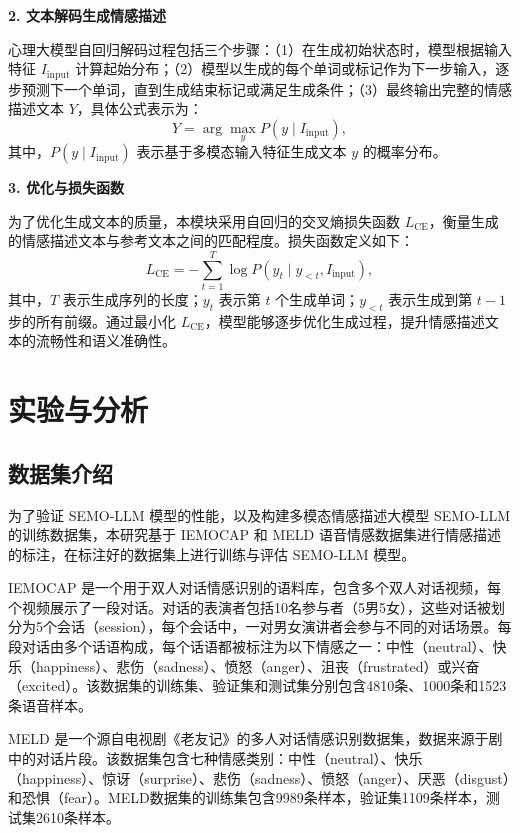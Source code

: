 \textbf{2. 文本解码生成情感描述}

心理大模型自回归解码过程包括三个步骤：（1）在生成初始状态时，模型根据输入特征 $I_{\text{input}}$ 计算起始分布；（2）模型以生成的每个单词或标记作为下一步输入，逐步预测下一个单词，直到生成结束标记或满足生成条件；（3）最终输出完整的情感描述文本 $Y$，具体公式表示为：
\begin{equation}
   Y = \arg\max_{y} P(y \mid I_{\text{input}}),
\end{equation}
其中，$P(y \mid I_{\text{input}})$ 表示基于多模态输入特征生成文本 $y$ 的概率分布。

\textbf{3. 优化与损失函数}

为了优化生成文本的质量，本模块采用自回归的交叉熵损失函数 $L_{\text{CE}}$，衡量生成的情感描述文本与参考文本之间的匹配程度。损失函数定义如下：
\begin{equation}
    L_{\text{CE}} = - \sum_{t=1}^{T} \log P(y_t \mid y_{<t}, I_{\text{input}}),
\end{equation}
其中，$T$ 表示生成序列的长度；$y_t$ 表示第 $t$ 个生成单词；$y_{<t}$ 表示生成到第 $t-1$ 步的所有前缀。通过最小化 $L_{\text{CE}}$，模型能够逐步优化生成过程，提升情感描述文本的流畅性和语义准确性。

\section{实验与分析}

\subsection{数据集介绍}

为了验证 SEMO-LLM 模型的性能，以及构建多模态情感描述大模型 SEMO-LLM 的训练数据集，本研究基于 IEMOCAP 和 MELD 语音情感数据集进行情感描述的标注，在标注好的数据集上进行训练与评估 SEMO-LLM 模型。

IEMOCAP \cite{Busso_Bulut_Lee_Kazemzadeh_Mower_Kim_Chang_Lee_Narayanan_2008} 是一个用于双人对话情感识别的语料库，包含多个双人对话视频，每个视频展示了一段对话。对话的表演者包括10名参与者（5男5女），这些对话被划分为5个会话（session），每个会话中，一对男女演讲者会参与不同的对话场景。每段对话由多个话语构成，每个话语都被标注为以下情感之一：中性（neutral）、快乐（happiness）、悲伤（sadness）、愤怒（anger）、沮丧（frustrated）或兴奋（excited）。该数据集的训练集、验证集和测试集分别包含4810条、1000条和1523条语音样本。

MELD \cite{Poria_Hazarika_Majumder_Naik_Cambria_Mihalcea_2019} 是一个源自电视剧《老友记》的多人对话情感识别数据集，数据来源于剧中的对话片段。该数据集包含七种情感类别：中性（neutral）、快乐（happiness）、惊讶（surprise）、悲伤（sadness）、愤怒（anger）、厌恶（disgust）和恐惧（fear）。MELD数据集的训练集包含9989条样本，验证集1109条样本，测试集2610条样本。

